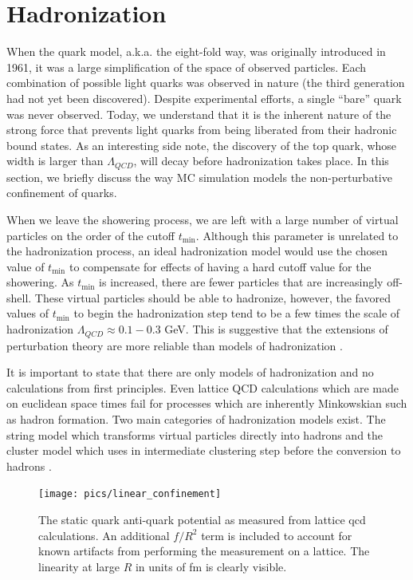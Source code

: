 \section{Hadronization} 

When the quark model, a.k.a. the eight-fold way, was originally introduced in 1961, it was a large simplification of the space of observed  particles. Each combination of possible light quarks was observed in nature (the third generation had not 
yet been discovered). Despite experimental efforts, a  single ``bare'' quark was never observed. Today,
we understand that it is the inherent nature of the strong force that prevents light quarks from being liberated from their 
hadronic bound states. As an interesting side note, the discovery of the top quark, whose width is  larger than $\Lambda_{QCD}$, 
will decay before hadronization takes place. In this section, we briefly discuss
 the way MC simulation models the non-perturbative confinement of quarks.

When we leave the showering process, we are left with a large number of virtual particles on the 
order of the cutoff $t_{\textrm{min}}$. Although this parameter is unrelated to the hadronization process, an ideal hadronization 
model would use the chosen value of $t_{\textrm{min}}$ to 
compensate for effects of having a hard cutoff value for the showering. As $t_{\textrm{min}}$ is increased, there are fewer 
particles that are increasingly off-shell. These virtual particles should be able to hadronize, however, the 
favored values of $t_{\textrm{min}}$ to begin the hadronization step tend to be a few times the
 scale of hadronization $\Lambda_{QCD} \approx 0.1 - 0.3$ GeV. This is suggestive that the extensions of perturbation theory
 are more reliable than models of hadronization \cite{qcdcollider}.

It is important to state that there are only models of hadronization and no calculations from 
first principles. 
Even lattice QCD calculations which are made on euclidean space times fail for processes which are inherently Minkowskian 
such as hadron formation. Two main categories of hadronization models exist. The string 
model which transforms virtual particles directly into hadrons and the cluster model which uses in intermediate clustering step before
the conversion to hadrons \cite{mcreview}. 

\begin{figure}
\begin{center}
\texttt{[image: pics/linear\_confinement]}
\end{center}
\caption{The static quark anti-quark potential as measured from lattice qcd calculations. An additional $f/R^2$ 
term is included to account for known artifacts from performing the measurement on a lattice. The linearity at large $R$ in units
of fm  is clearly visible.}
\label{fig:linear_confinement}
\end{figure}


